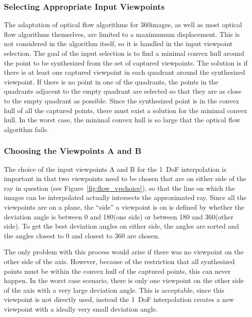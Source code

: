 \subsubsection{Selecting Appropriate Input Viewpoints}
The adaptation of optical flow algorithms for 360\degree images, as well as most optical flow algorithms themselves, are limited to a maximumum displacement. This is not considered in the algorithm itself, so it is handled in the input viewpoint selection. The goal of the input selection is to find a minimal convex hull around the point to be synthesized from the set of captured viewpoints. The solution is if there is at least one captured viewpoint in each quadrant around the synthesized viewpoint. If there is no point in one of the quadrants, the points in the quadrants adjacent to the empty quadrant are selected so that they are as close to the empty quadrant as possible. Since the synthesized point is in the convex hull of all the captured points, there must exist a solution for the minimal convex hull. In the worst case, the minimal convex hull is so large that the optical flow algorithm fails.

\subsubsection{Choosing the Viewpoints A and B}
The choice of the input viewpoints A and B for the 1~DoF interpolation is important in that two viewpoints need to be chosen that are on either side of the ray in question (see Figure~\ref{fig:flow_vpchoice}), so that the line on which the images can be interpolated actually intersects the approximated ray. Since all the viewpoints are on a plane, the ``side'' a viewpoint is on is defined by whether the deviation angle is between 0 and 180\degree (one side) or between 180 and 360\degree (other side). 
To get the best deviation angles on either side, the angles are sorted and the angles closest to 0 and closest to 360 are chosen.

The only problem with this process would arise if there was no viewpoint on the other side of the axis. However, because of the restriction that all synthesized points must be within the convex hull of the captured points, this can never happen. In the worst case scenario, there is only one viewpoint on the other side of the axis with a very large deviation angle. This is acceptable, since this viewpoint is not directly used, instead the 1~DoF interpolation creates a new viewpoint with a ideally very small deviation angle.

